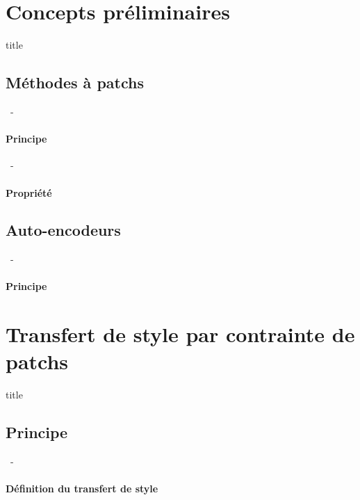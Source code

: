 \documentclass[aspectratio=169, 22pt]{beamer}
\begin{document}
\section{Concepts préliminaires}
\begin{frame}
  \begin{beamercolorbox}[sep=15pt,center,shadow=true,rounded=true]{title}
    \LARGE\bfseries \secname
  \end{beamercolorbox}
\end{frame}

\subsection{Méthodes à patchs}
\begin{frame}{\secname~- \subsecname}
  \framesubtitle{Principe}
\end{frame}

\begin{frame}{\secname~- \subsecname}
  \framesubtitle{Propriété}
\end{frame}

\subsection{Auto-encodeurs}
\begin{frame}{\secname~- \subsecname}
  \framesubtitle{Principe}
\end{frame}

\section{Transfert de style par contrainte de patchs}
\begin{frame}
  \begin{beamercolorbox}[sep=15pt,center,shadow=true,rounded=true]{title}
    \LARGE\bfseries \secname
  \end{beamercolorbox}
\end{frame}

\subsection{Principe}
\begin{frame}{\secname~- \subsecname}
  \framesubtitle{Définition du transfert de style}
\end{frame}
\end{document}
